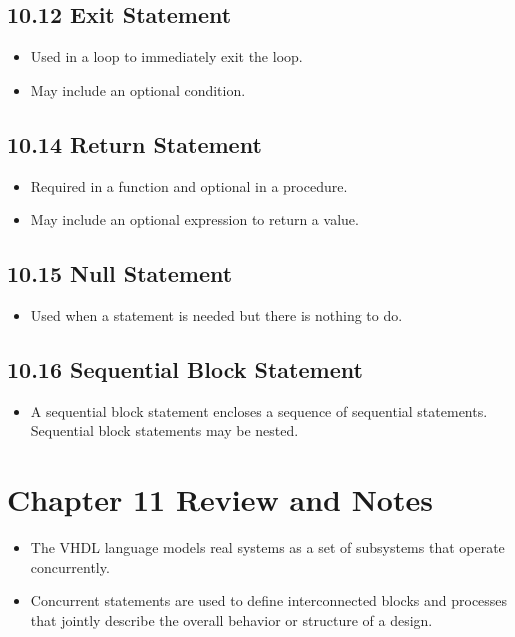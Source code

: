 \documentclass[a4paper,12pt]{article}
\begin{document}
	\subsection*{10.12 Exit Statement}
	\begin{itemize}
		\item Used in a loop to immediately exit the loop.
		\item May include an optional condition.
	\end{itemize}
	
	\subsection*{10.14 Return Statement}
	\begin{itemize}
		\item Required in a function and optional in a procedure.
		\item May include an optional expression to return a value.
	\end{itemize}
	
	\subsection*{10.15 Null Statement}
	\begin{itemize}
		\item Used when a statement is needed but there is nothing to do.
	\end{itemize}
	
	\subsection*{10.16 Sequential Block Statement}
	\begin{itemize}
		\item A sequential block statement encloses a sequence of sequential statements. Sequential block statements may
		be nested.
	\end{itemize}
	
	
	\section*{Chapter 11 Review and Notes}
	\begin{itemize}
		\item The VHDL language models real systems as a set of subsystems that operate concurrently.
		\item Concurrent statements are used to define interconnected blocks and processes that jointly describe the overall behavior or structure of a design.
	\end{itemize}
	
\end{document}
